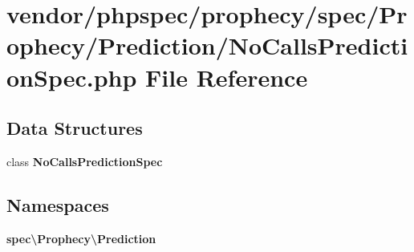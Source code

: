 \section{vendor/phpspec/prophecy/spec/\+Prophecy/\+Prediction/\+No\+Calls\+Prediction\+Spec.php File Reference}
\label{_no_calls_prediction_spec_8php}
\subsection*{Data Structures}
\begin{DoxyCompactItemize}
\item 
class {\bf No\+Calls\+Prediction\+Spec}
\end{DoxyCompactItemize}
\subsection*{Namespaces}
\begin{DoxyCompactItemize}
\item 
 {\bf spec\textbackslash{}\+Prophecy\textbackslash{}\+Prediction}
\end{DoxyCompactItemize}

